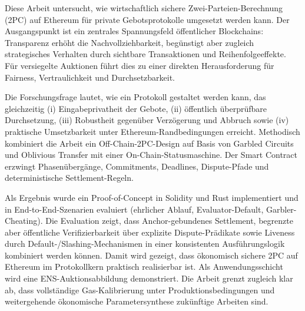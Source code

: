 \documentclass[final,twoside]{vutinfth}
\begin{document}
\begin{kurzfassung}
Diese Arbeit untersucht, wie wirtschaftlich sichere Zwei-Parteien-Berechnung
(2PC) auf Ethereum für private Gebotsprotokolle umgesetzt werden kann. Der
Ausgangspunkt ist ein zentrales Spannungsfeld öffentlicher Blockchains:
Transparenz erhöht die Nachvollziehbarkeit, begünstigt aber zugleich
strategisches Verhalten durch sichtbare Transaktionen und Reihenfolgeeffekte.
Für versiegelte Auktionen führt dies zu einer direkten Herausforderung für
Fairness, Vertraulichkeit und Durchsetzbarkeit.

Die Forschungsfrage lautet, wie ein Protokoll gestaltet werden kann, das
gleichzeitig (i) Eingabeprivatheit der Gebote, (ii) öffentlich überprüfbare
Durchsetzung, (iii) Robustheit gegenüber Verzögerung und Abbruch sowie
(iv) praktische Umsetzbarkeit unter Ethereum-Randbedingungen erreicht.
Methodisch kombiniert die Arbeit ein Off-Chain-2PC-Design auf Basis von
Garbled Circuits und Oblivious Transfer mit einer On-Chain-Statusmaschine.
Der Smart Contract erzwingt Phasenübergänge, Commitments, Deadlines,
Dispute-Pfade und deterministische Settlement-Regeln.

Als Ergebnis wurde ein Proof-of-Concept in Solidity und Rust implementiert und
in End-to-End-Szenarien evaluiert (ehrlicher Ablauf, Evaluator-Default,
Garbler-Cheating). Die Evaluation zeigt, dass
Anchor-gebundenes Settlement, begrenzte aber öffentliche
Verifizierbarkeit über explizite Dispute-Prädikate sowie Liveness durch
Default-/Slashing-Mechanismen in einer konsistenten Ausführungslogik kombiniert
werden können. Damit wird gezeigt, dass ökonomisch sichere 2PC auf Ethereum im
Protokollkern praktisch realisierbar ist. Als Anwendungsschicht wird eine
ENS-Auktionsabbildung demonstriert. Die Arbeit grenzt zugleich klar ab, dass
vollständige Gas-Kalibrierung unter Produktionsbedingungen und weitergehende
ökonomische Parametersynthese zukünftige Arbeiten sind.
\end{kurzfassung}
\end{document}
